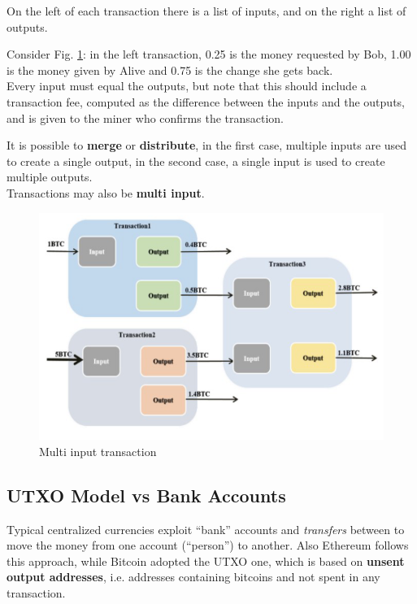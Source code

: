 On the left of each transaction there is a list of inputs, and on the right a list of outputs. 

Consider Fig. \ref{fig:bitcoin_multiinput}: in the left transaction, 0.25 is the money requested by Bob, 1.00 is the money given by Alive and 0.75 is the change she gets back.\\
Every input must equal the outputs, but note that this should include a transaction fee, computed as the difference between the inputs and the outputs, and is given to the miner who confirms the transaction.

It is possible to \textbf{merge} or \textbf{distribute}, in the first case, multiple inputs are used to create a single output, in the second case, a single input is used to create multiple outputs.\\
Transactions may also be \textbf{multi input}.

\begin{figure}[htbp]
   \centering
   \includegraphics{images/bitcoin_multiinput.png}
   \caption{Multi input transaction}
   \label{fig:bitcoin_multiinput}
\end{figure}

\subsection{UTXO Model vs Bank Accounts}
Typical centralized currencies exploit ``bank'' accounts and \textit{transfers} between to move the money from one account (``person'') to another.
Also Ethereum follows this approach, while Bitcoin adopted the UTXO one, which is based on \textbf{unsent output addresses}, i.e. addresses containing bitcoins and not spent in any
transaction.

